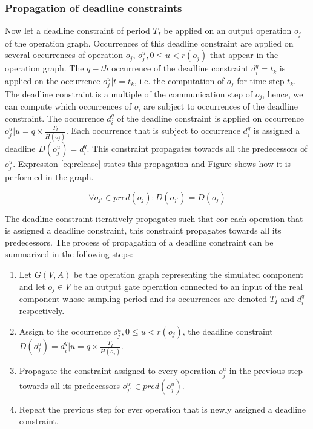 \subsubsection{Propagation of deadline constraints}

Now let a deadline constraint of period $T_I$ be applied on an output operation $o_j$ of the operation graph. Occurrences of this deadline constraint are applied on several occurrences of operation $o_j$, $o^u_j, 0 \leq u < r(o_j)$ that appear in the operation graph. The $q-th$ occurrence of the deadline constraint $d_i^q = t_k$ is applied on the occurrence $o^u_j | t = t_k$, i.e. the computation of ${o_j}$ for time step $t_k$. The deadline constraint is a multiple of the communication step of $o_j$, hence, we can compute which occurrences of $o_i$ are subject to occurrences of the deadline constraint. The occurrence $d_i^q$ of the deadline constraint is applied on occurrence $o^u_j | u = q \times \frac{T_I}{H(o_j)}$. Each occurrence that is subject to occurrence $d_i^q$ is assigned a deadline $D(o_j^u) = d_i^q$. This constraint propagates towards all the predecessors of $o_j^u$. Expression \ref{eq:release} states this propagation and Figure shows how it is performed in the graph.

\begin{equation}
\forall o_{j'} \in pred(o_j): D(o_{j'}) = D(o_j)
\label{eq:release}
\end{equation}

The deadline constraint iteratively propagates such that eor each operation that is assigned a deadline constraint, this constraint propagates towards all its predecessors. The process of propagation of a deadline constraint can be summarized in the following steps:

\begin{enumerate}
\item Let $G(V,A)$ be the operation graph representing the simulated component and let $o_j \in  V$ be an output gate operation connected to an input of the real component whose sampling period and its occurrences are denoted $T_I$ and $d_i^q$ respectively.
\item Assign to the occurrence $o_j^u, 0 \leq u < r(o_j)$, the deadline constraint $D(o_j^u) = d_i^q | u = q \times \frac{T_I}{H(o_j)}$.
\item Propagate the constraint assigned to every operation $o_j^u$ in the previous step towards all its predecessors $o_{j'}^{u'} \in pred(o_j^u)$.
\item Repeat the previous step for ever operation that is newly assigned a deadline constraint.
\end{enumerate}

